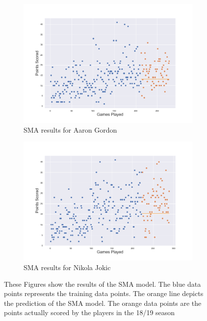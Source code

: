 \documentclass[a4paper,11pt,twoside]{article}
\begin{document}
\begin{figure} [h!]
\centering
  \begin{subfigure}[b]{0.75\textwidth}
    \includegraphics[width=\textwidth]{../players_sma/player3.png}
    \caption{SMA results for Aaron Gordon}
    \label{fig:1}
  \end{subfigure}
  \begin{subfigure}[b]{0.75\textwidth}
    \includegraphics[width=\textwidth]{../players_sma/player24.png}
    \caption{SMA results for Nikola Jokic}
    \label{fig:2}
  \end{subfigure}
  \caption{These Figures show the results of the SMA model. The blue data points represents the training data points. The orange line depicts the prediction of the SMA model. The orange data points are the points actually scored by the players in the 18/19 season}
\end{figure}
\end{document}
